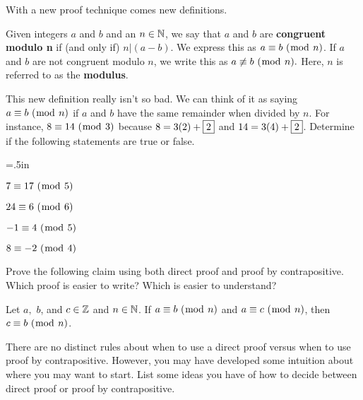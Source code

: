 \noindent  With a new proof technique comes new definitions.
\begin{definition}  Given integers $a$ and $b$ and an $n \in \mathbb{N}$, we say that $a$ and $b$ are \textbf{congruent modulo n} if (and only if) $n|(a-b)$.  We express this as $ a \equiv b \ (\bmod \ n)$.  If $a$ and $b$ are not congruent modulo $n$, we write this as $a \not\equiv b \ (\bmod \ n).$  Here, $n$ is referred to as the \textbf{modulus}.
\end{definition}

\begin{question}[resume]
\item This new definition really isn't so bad.  We can think of it as saying $a \equiv b \ (\bmod \ n)$ if $a$ and $b$ have the same remainder when divided by $n$.  For instance, $8 \equiv 14 \ (\bmod \ 3)$ because $8=3(2)+\fbox{2}$ and $14=3(4)+\fbox{2}$.  Determine if the following statements are true or false.
	\begin{qpart} \itemsep=.5in
	\item $7 \equiv 17 \ (\bmod \ 5)$
	\item $24 \equiv 6 \ (\bmod \ 6)$
	\item $-1 \equiv 4 \ (\bmod \ 5)$
	\item $8 \equiv -2 \ (\bmod \ 4)$ 
	\vspace{.5in}
	\end{qpart}

\item Prove the following claim using both direct proof and proof by contrapositive.  Which proof is easier to write?  Which is easier to understand?  %


\begin{claim} Let $a,$ $b$, and $c \in \mathbb{Z}$ and $n \in \mathbb{N}$.  If $a \equiv b \ (\bmod \ n)$ and $a \equiv c \ (\bmod \ n)$, then $c \equiv b \ (\bmod \ n)$.
\end{claim}

\newpage


\item There are no distinct rules about when to use a direct proof versus when to use proof by contrapositive.  However, you may have developed some intuition about where you may want to start.  List some ideas you have of how to decide between direct proof or proof by contrapositive.

\end{question}





